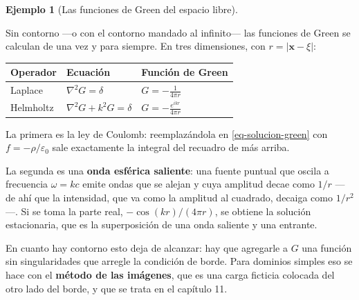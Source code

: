 \documentclass[
  spanish,
  a4paper,
]{scrbook}
\newcounter{none} %
\theoremstyle{definition}
\theoremstyle{plain}
\theoremstyle{definition}
\newtheorem{example}{Ejemplo}[chapter]
\theoremstyle{plain}
\theoremstyle{definition}
\theoremstyle{remark}
\begin{document}
\begin{example}[Las funciones de Green del espacio
libre]\protect\hypertarget{exm-green-libres}{}\label{exm-green-libres}

Sin contorno ---o con el contorno mandado al infinito--- las funciones
de Green se calculan de una vez y para siempre. En tres dimensiones, con
\(r = |\mathbf{x}-\xi|\):

{\def\LTcaptype{none} %
\begin{longtable}[]{@{}
  >{\raggedright\arraybackslash}p{}
  >{\raggedright\arraybackslash}p{}
  >{\raggedright\arraybackslash}p{}@{}}
\toprule\noalign{}
\begin{minipage}[b]{\linewidth}\raggedright
Operador
\end{minipage} & \begin{minipage}[b]{\linewidth}\raggedright
Ecuación
\end{minipage} & \begin{minipage}[b]{\linewidth}\raggedright
Función de Green
\end{minipage} \\
\midrule\noalign{}
\endhead
\bottomrule\noalign{}
\endlastfoot
Laplace & \(\nabla^2 G = \delta\) &
\(\displaystyle G = -\frac{1}{4\pi r}\) \\
Helmholtz & \(\nabla^2 G + k^2G = \delta\) &
\(\displaystyle G = -\frac{e^{ikr}}{4\pi r}\) \\
\end{longtable}
}

La primera es la ley de Coulomb: reemplazándola en
\ref{eq-solucion-green} con \(f = -\rho/\varepsilon_0\) sale exactamente
la integral del recuadro de más arriba.

La segunda es una \textbf{onda esférica saliente}: una fuente puntual
que oscila a frecuencia \(\omega = kc\) emite ondas que se alejan y cuya
amplitud decae como \(1/r\) ---de ahí que la intensidad, que va como la
amplitud al cuadrado, decaiga como \(1/r^2\)---. Si se toma la parte
real, \(-\cos(kr)/(4\pi r)\), se obtiene la solución estacionaria, que
es la superposición de una onda saliente y una entrante.

En cuanto hay contorno esto deja de alcanzar: hay que agregarle a \(G\)
una función sin singularidades que arregle la condición de borde. Para
dominios simples eso se hace con el \textbf{método de las imágenes}, que
es una carga ficticia colocada del otro lado del borde, y que se trata
en el capítulo 11.

\end{example}
\end{document}
